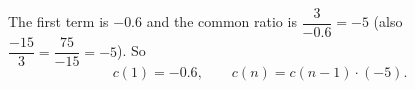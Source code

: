 The first term is $-0.6$ and the common ratio is $\dfrac{3}{-0.6}=-5$ (also $\dfrac{-15}{3}=\dfrac{75}{-15}=-5$). So
\[
\boxed{c(1)=-0.6,\qquad c(n)=c(n-1)\cdot(-5)} .
\]
